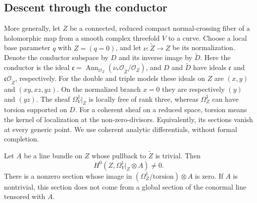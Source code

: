 \documentclass[11pt]{article}
\numberwithin{equation}{section}
\begin{document}
\subsection{Descent through the conductor}

More generally, let $Z$ be a connected, reduced compact normal-crossing
fiber of a holomorphic map from a smooth complex threefold $V$ to
a curve. Choose
a local base parameter $q$ with $Z=(q=0)$, and let
$\nu:\widetilde Z\to Z$ be its normalization. Denote the conductor
subspace by $D$ and its inverse image by $\widetilde D$.
Here the conductor is the ideal
$\mathfrak c=\operatorname{Ann}_{\mathcal O_Z}(\nu_*\mathcal O_{\widetilde Z}/\mathcal O_Z)$,
and $D$ and $\widetilde D$ have ideals $\mathfrak c$ and
$\mathfrak c\mathcal O_{\widetilde Z}$, respectively.
For the double and triple models these ideals on $Z$ are
$(x,y)$ and $(xy,xz,yz)$. On the normalized branch $x=0$ they
are respectively $(y)$ and $(yz)$.
The sheaf $\Omega_V^1|_Z$ is locally free of rank three, whereas
$\Omega_Z^1$ can have torsion supported on $D$.
For a coherent sheaf on a reduced space, torsion means the kernel
of localization at the non-zero-divisors. Equivalently, its
sections vanish at every generic point. We use coherent analytic
differentials, without formal completion.

\begin{lemma}\label{ad:lem:conductor-section}
Let $A$ be a line bundle on $Z$ whose pullback to $\widetilde Z$
is trivial. Then
\[
 H^0(Z,\Omega_V^1|_Z\otimes A)\ne0.
\]
There is a nonzero section whose image in
$(\Omega_Z^1/\mathrm{torsion})\otimes A$ is zero. If $A$ is
nontrivial, this section does not come from a global section of
the conormal line tensored with $A$.
\end{lemma}
\end{document}
